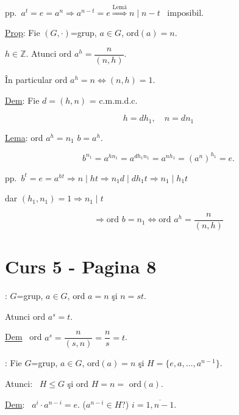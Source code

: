 \noindent pp.\ $a^t=e=a^n \Rightarrow a^{n-t}=e \overset{\text{Lemă}}{\Longrightarrow} n\mid n-t$ \ imposibil.

\begin{center}
\end{center}

\bigskip
\noindent\underline{Prop}: Fie $(G,\cdot)$=grup, $a\in G$, ord$(a)=n$.

\noindent $h\in\mathbb{Z}$. Atunci ord $a^h = \dfrac{n}{(n,h)}$.

\bigskip
\noindent În particular ord $a^h=n \Leftrightarrow (n,h)=1$.

\bigskip
\noindent\underline{Dem}: Fie $d=(h,n)$ = c.m.m.d.c.

\[
h=dh_1, \quad n=dn_1
\]

\noindent\underline{Lema}: ord $a^h = n_1$ \qquad $b=a^h$.

\[
b^{n_1} = a^{hn_1} = a^{dh_1n_1} = a^{nh_1} = (a^n)^{h_1} = e.
\]

\noindent pp.\ $b^t=e=a^{ht} \Rightarrow n\mid ht \Rightarrow n_1d\mid dh_1t \Rightarrow n_1\mid h_1t$

\noindent dar $(h_1,n_1)=1 \Rightarrow n_1\mid t$

\[
\Rightarrow \text{ord } b=n_1 \Leftrightarrow \text{ord } a^h = \frac{n}{(n,h)}
\]



\section*{Curs 5 - Pagina 8}

\noindent{}: $G$=grup, $a\in G$, ord $a=n$ şi $n=st$.

\noindent Atunci ord $a^s=t$.

\bigskip
\noindent\underline{Dem} \ ord $a^s = \dfrac{n}{(s,n)} = \dfrac{n}{s} = t$.

\bigskip
\noindent{}: Fie $G$=grup, $a\in G$, ord$(a)=n$ şi $H=\{e,a,\ldots,a^{n-1}\}$.

\noindent Atunci: \ $H\leq G$ şi ord $H=n=$ ord$(a)$.

\bigskip
\noindent\underline{Dem}: \ $a^i\cdot a^{n-i}=e$. \quad ($a^{n-i}\in H$?) \quad $i=\overline{1,n-1}$.

